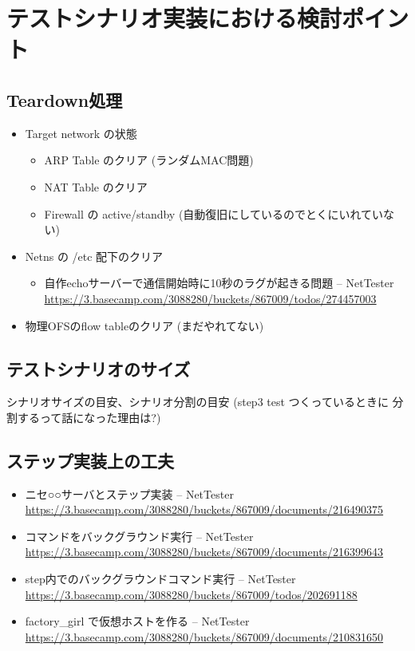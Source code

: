 \section{テストシナリオ実装における検討ポイント}

\subsection{Teardown処理}

\begin{itemize}
 \item Target network の状態
       \begin{itemize}
        \item ARP Table のクリア (ランダムMAC問題)
        \item NAT Table のクリア
        \item Firewall の active/standby (自動復旧にしているのでとくにいれていない)
       \end{itemize}
 \item Netns の /etc 配下のクリア
       \begin{itemize}
        \item 自作echoサーバーで通信開始時に10秒のラグが起きる問題 – NetTester \url{https://3.basecamp.com/3088280/buckets/867009/todos/274457003}
       \end{itemize}
 \item 物理OFSのflow tableのクリア (まだやれてない)
\end{itemize}

\subsection{テストシナリオのサイズ}

シナリオサイズの目安、シナリオ分割の目安 (step3 test つくっているときに
分割するって話になった理由は?)

\subsection{ステップ実装上の工夫}
\begin{itemize}
 \item ニセ○○サーバとステップ実装 – NetTester \url{https://3.basecamp.com/3088280/buckets/867009/documents/216490375}
 \item コマンドをバックグラウンド実行 – NetTester \url{https://3.basecamp.com/3088280/buckets/867009/documents/216399643}
 \item step内でのバックグラウンドコマンド実行 – NetTester \url{https://3.basecamp.com/3088280/buckets/867009/todos/202691188}
 \item factory\_girl で仮想ホストを作る – NetTester \url{https://3.basecamp.com/3088280/buckets/867009/documents/210831650}
\end{itemize}

